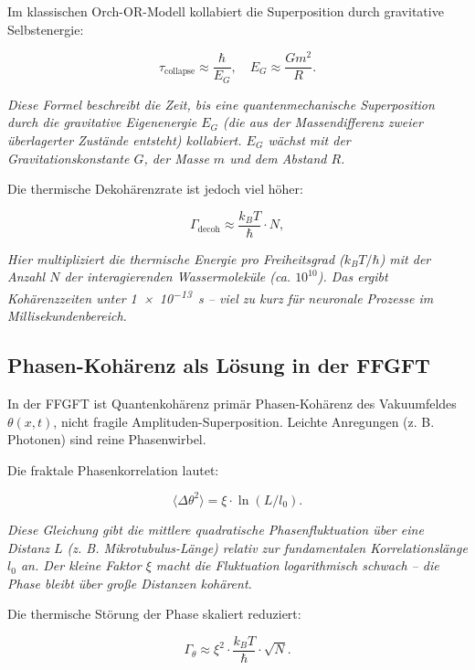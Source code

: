 	Im klassischen Orch-OR-Modell kollabiert die Superposition durch gravitative Selbstenergie:
	
	\begin{equation}
		\tau_{\text{collapse}} \approx \frac{\hbar}{E_G}, \quad E_G \approx \frac{G m^2}{R}.
	\end{equation}
	
	\textit{Diese Formel beschreibt die Zeit, bis eine quantenmechanische Superposition durch die gravitative Eigenenergie \(E_G\) (die aus der Massendifferenz zweier überlagerter Zustände entsteht) kollabiert. \(E_G\) wächst mit der Gravitationskonstante \(G\), der Masse \(m\) und dem Abstand \(R\).}
	
	Die thermische Dekohärenzrate ist jedoch viel höher:
	
	\begin{equation}
		\Gamma_{\text{decoh}} \approx \frac{k_B T}{\hbar} \cdot N,
	\end{equation}
	
	\textit{Hier multipliziert die thermische Energie pro Freiheitsgrad (\(k_B T / \hbar\)) mit der Anzahl \(N\) der interagierenden Wassermoleküle (ca. \(10^{10}\)). Das ergibt Kohärenzzeiten unter \SI{1e-13}{\second} – viel zu kurz für neuronale Prozesse im Millisekundenbereich.}
	
	\subsection*{Phasen-Kohärenz als Lösung in der FFGFT}
	
	In der FFGFT ist Quantenkohärenz primär Phasen-Kohärenz des Vakuumfeldes \(\theta(x,t)\), nicht fragile Amplituden-Superposition. Leichte Anregungen (z. B. Photonen) sind reine Phasenwirbel.
	
	Die fraktale Phasenkorrelation lautet:
	
	\begin{equation}
		\langle \Delta \theta^2 \rangle = \xi \cdot \ln(L / l_0).
	\end{equation}
	
	\textit{Diese Gleichung gibt die mittlere quadratische Phasenfluktuation über eine Distanz \(L\) (z. B. Mikrotubulus-Länge) relativ zur fundamentalen Korrelationslänge \(l_0\) an. Der kleine Faktor \(\xi\) macht die Fluktuation logarithmisch schwach – die Phase bleibt über große Distanzen kohärent.}
	
	Die thermische Störung der Phase skaliert reduziert:
	
	\begin{equation}
		\Gamma_{\theta} \approx \xi^2 \cdot \frac{k_B T}{\hbar} \cdot \sqrt{N}.
	\end{equation}
	
